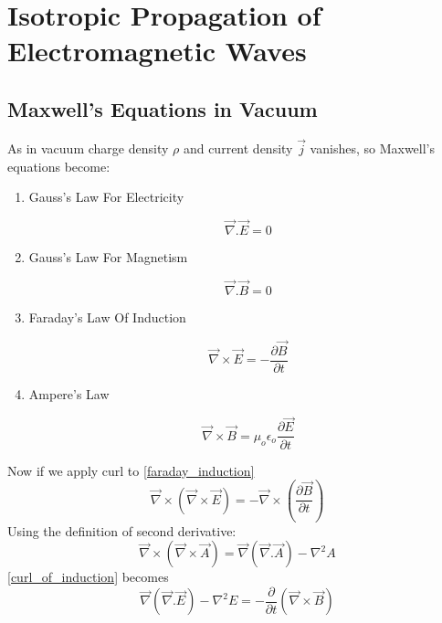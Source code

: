 \chapter{Isotropic Propagation of Electromagnetic Waves}

\section{Maxwell's Equations in Vacuum}

As in vacuum charge density $\rho$ and current density $\vec{j}$ vanishes, so Maxwell's equations become:

\begin{enumerate}

   \item Gauss’s Law For Electricity

      \begin{equation}\label{gauss_law}
      \vec{\nabla}.\vec{E} = 0
      \end{equation}

   \item Gauss’s Law For Magnetism

      \begin{equation}
      \vec{\nabla}.\vec{B} = 0
      \end{equation}

   \item Faraday’s Law Of Induction

      \begin{equation}\label{faraday_induction}
      \vec{\nabla}\times\vec{E} = - \frac{\partial\vec{B}}{\partial t}
      \end{equation}

   \item Ampere’s Law

      \begin{equation}\label{amperes_law}
      \vec{\nabla}\times\vec{B} = \mu_{o}\epsilon_{o}\frac{\partial\vec{E}}{\partial t}
      \end{equation}

\end{enumerate}

Now if we apply curl to \eqref{faraday_induction}
%
   \begin{equation}\label{curl_of_induction}
   \vec{\nabla}\times(\vec{\nabla}\times\vec{E}) = - \vec{\nabla}\times(\frac{\partial\vec{B}}{\partial t})
   \end{equation}
%
Using the definition of second derivative:
%
   \begin{equation}
   \vec{\nabla}\times(\vec{\nabla}\times\vec{A}) = \vec{\nabla}(\vec{\nabla}.\vec{A})-{\nabla}^2A
   \end{equation}
%
\eqref{curl_of_induction} becomes
%
   \begin{equation}
   \vec{\nabla}(\vec{\nabla}.\vec{E})-{\nabla}^2E = - \frac{\partial}{\partial t}(\vec{\nabla}\times\vec{B})
   \end{equation}

